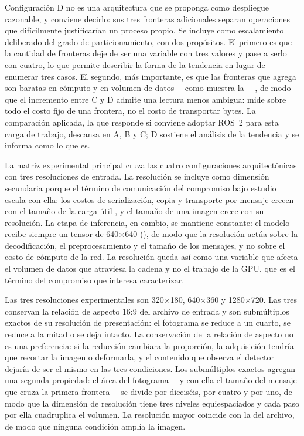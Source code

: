 Configuración D no es una arquitectura que se proponga como despliegue
razonable, y conviene decirlo: sus tres fronteras adicionales separan
operaciones que difícilmente justificarían un proceso propio. Se incluye
como escalamiento deliberado del grado de particionamiento, con dos
propósitos. El primero es que la cantidad de fronteras deje de ser una
variable con tres valores y pase a serlo con cuatro, lo que permite
describir la forma de la tendencia en lugar de enumerar tres casos. El
segundo, más importante, es que las fronteras que agrega son baratas en
cómputo y en volumen de datos ---como muestra la
---, de modo que el incremento entre C y D
admite una lectura menos ambigua: mide sobre todo el costo fijo de una
frontera, no el costo de transportar bytes. La comparación aplicada, la que
responde si conviene adoptar ROS~2 para esta carga de trabajo, descansa en A,
B y C; D sostiene el análisis de la tendencia y se informa como lo que es.

La matriz experimental principal cruza las cuatro configuraciones
arquitectónicas con tres resoluciones de entrada. La resolución se incluye
como dimensión secundaria porque el término de comunicación del compromiso
bajo estudio escala con ella: los costos de serialización, copia y
transporte por mensaje crecen con el tamaño de la carga útil
\cite{kronauer2021, macenski2022, luo2025}, y el tamaño de una imagen crece
con su resolución. La etapa de inferencia, en cambio, se mantiene constante:
el modelo recibe siempre un tensor de 640$\times$640
(), de modo que la resolución actúa sobre la
decodificación, el preprocesamiento y el tamaño de los mensajes, y no sobre
el costo de cómputo de la red. La resolución queda así como una variable que
afecta el volumen de datos que atraviesa la cadena y no el trabajo de la
GPU, que es el término del compromiso que interesa caracterizar.

Las tres resoluciones experimentales son 320$\times$180, 640$\times$360 y
1280$\times$720. Las tres conservan la relación de aspecto 16:9 del archivo
de entrada y son submúltiplos exactos de su resolución de presentación: el
fotograma se reduce a un cuarto, se reduce a la mitad o se deja intacto. La
conservación de la relación de aspecto no es una preferencia: si la reducción
cambiara la proporción, la adquisición tendría que recortar la imagen o
deformarla, y el contenido que observa el detector dejaría de ser el mismo en
las tres condiciones. Los submúltiplos exactos agregan una segunda propiedad:
el área del fotograma ---y con ella el tamaño del mensaje que cruza la primera
frontera--- se divide por dieciséis, por cuatro y por uno, de modo que la
dimensión de resolución tiene tres niveles equiespaciados y cada paso por
ella cuadruplica el volumen. La resolución mayor coincide con la del archivo,
de modo que ninguna condición amplía la imagen.

